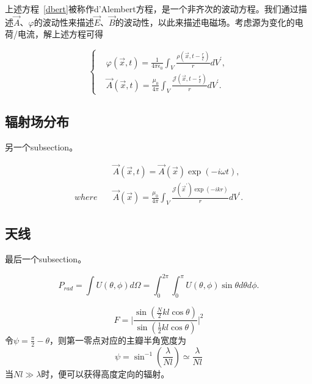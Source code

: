 \documentclass[a4paper,11pt,onecolumn,twoside]{article}
\begin{document}
\begin{multicols}{2}
上述方程~\ref{dbert}被称作d'Alembert方程，是一个非齐次的波动方程。我们通过描述$\vec{A}$、$\varphi$的波动性来描述$\vec{E}$、$\vec{B}$的波动性，以此来描述电磁场。考虑源为变化的电荷/电流，解上述方程可得

\begin{equation}
\left\{
\begin{aligned}
& \varphi(\vec{x},t) = \frac{1}{4\pi \epsilon_0} \int_{V} \frac{\rho(\vec{x},t-\frac{r}{c})}{r} dV^{'}, \\
& \vec{A}(\vec{x},t) = \frac{\mu_0}{4\pi} \int_{V} \frac{\mathcal{J}(\vec{x},t-\frac{r}{c})}{r} dV^{'}.
\end{aligned}
\right.
\end{equation}


\subsection{辐射场分布}

另一个subsection。

\begin{equation}
\begin{split}
& \vec{A}(\vec{x},t) = \vec{A}(\vec{x})\exp(-i\omega t), \\
where \quad & \vec{A}(\vec{x}) = \frac{\mu_0}{4\pi} \int_{V} \frac{\mathcal{J}(\vec{x}^{'}) \exp(-ikr)}{r} dV^{'}.
\end{split}
\end{equation}


\subsection{天线}

最后一个subsection。

\begin{equation*}
P_{rad} = \int U(\theta,\phi) d\Omega = \int_{0}^{2\pi} \int_{0}^{\pi} U(\theta,\phi) \sin \theta d\theta d\phi.
\end{equation*}

\begin{equation}
F = \Bigg| \frac{\sin(\frac{N}{2}kl\cos \theta)}{\sin(\frac{1}{2}kl\cos \theta)} \Bigg|^2
\end{equation}
令$\psi = \frac{\pi}{2}-\theta$，则第一零点对应的主瓣半角宽度为
\begin{equation}
\psi = \sin^{-1} (\frac{\lambda}{Nl}) \simeq \frac{\lambda}{Nl}
\end{equation}
当$Nl\gg \lambda$时，便可以获得高度定向的辐射。


\end{multicols}
\end{document}
